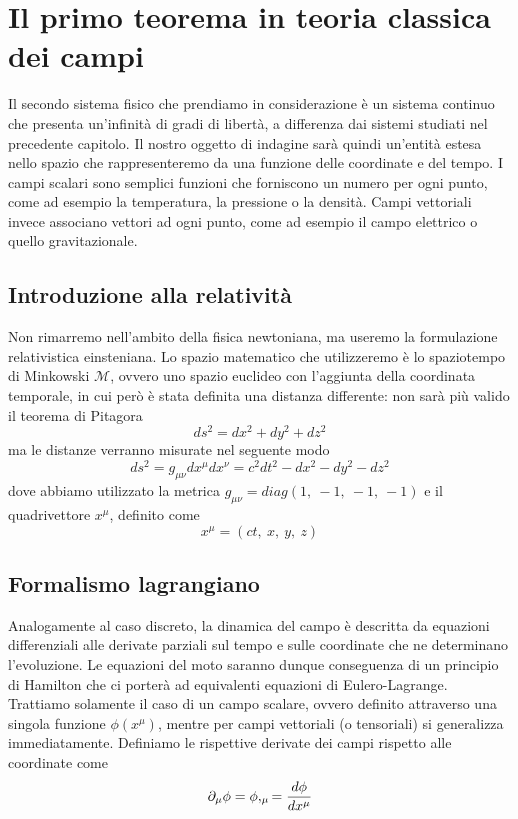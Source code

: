 \chapter{Il primo teorema in teoria classica dei campi}

    Il secondo sistema fisico che prendiamo in considerazione è un sistema continuo che presenta un'infinità di gradi di libertà, a differenza dai sistemi studiati nel precedente capitolo. 
    Il nostro oggetto di indagine sarà quindi un'entità estesa nello spazio che rappresenteremo da una funzione delle coordinate e del tempo. I campi scalari sono semplici funzioni che forniscono un numero per ogni punto, come ad esempio la temperatura, la pressione o la densità. Campi vettoriali invece associano vettori ad ogni punto, come ad esempio il campo elettrico o quello gravitazionale.

\section{Introduzione alla relatività}
    Non rimarremo nell'ambito della fisica newtoniana, ma useremo la formulazione relativistica einsteniana. Lo spazio matematico che utilizzeremo è lo spaziotempo di Minkowski $\mathcal M$, ovvero uno spazio euclideo con l'aggiunta della coordinata temporale, in cui però è stata definita una distanza differente: non sarà più valido il teorema di Pitagora 
    \begin{equation*}
        ds^2 = dx^2 + dy^2 + dz^2
    \end{equation*}
    ma le distanze verranno misurate nel seguente modo
    \begin{equation*}
        ds^2 = g_{\mu\nu} dx^\mu dx^\nu = c^2 dt^2 - dx^2 - dy^2 - dz^2
    \end{equation*}
    dove abbiamo utilizzato la metrica $g_{\mu\nu} = diag(1,~-1,~-1,~-1)$ e il quadrivettore $x^\mu$, definito come 
    \begin{equation*}
        x^\mu = (ct,~x,~y,~z)
    \end{equation*}

\section{Formalismo lagrangiano}    

    Analogamente al caso discreto, la dinamica del campo è descritta da equazioni differenziali alle derivate parziali sul tempo e sulle coordinate che ne determinano l'evoluzione. Le equazioni del moto saranno dunque conseguenza di un principio di Hamilton che ci porterà ad equivalenti equazioni di Eulero-Lagrange. Trattiamo solamente il caso di un campo scalare, ovvero definito attraverso una singola funzione $\phi(x^\mu)$, mentre per campi vettoriali (o tensoriali) si generalizza immediatamente. Definiamo le rispettive derivate dei campi rispetto alle coordinate come
    \begin{equation*}
        \partial_\mu \phi =  \phi,_\mu = \frac{d\phi}{dx^\mu}
    \end{equation*}

